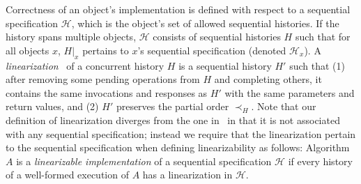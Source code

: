 


Correctness of an object's implementation is defined with respect to a
sequential specification $\mathcal{H}$, which is the object's set of allowed sequential histories.
If the history spans multiple objects, $\mathcal{H}$ consists of sequential histories $H$ such that for all
objects $x$, $H|_x$ pertains to $x$'s sequential specification (denoted $\mathcal{H}_x$).
A \emph{linearization}~\cite{herlihy1990linearizability} of a concurrent history $H$ is a
sequential history $H'$ such that (1) after removing some pending
operations from $H$ and completing others, it contains the same invocations and
responses as $H'$ with the same parameters and return values, and (2) $H'$
preserves the partial order $\prec_H$.
Note that our definition of linearization diverges from the one in~\cite{herlihy1990linearizability} in that
it is not associated with any sequential specification; instead we require that
the linearization pertain to the sequential specification when defining linearizability as follows:
Algorithm $A$ is a \emph{linearizable implementation}
of a sequential specification $\mathcal{H}$ if every history of a
well-formed execution of $A$ has a linearization in $\mathcal{H}$.


